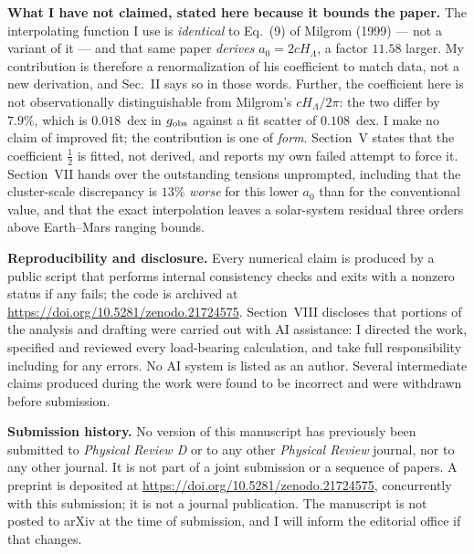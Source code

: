 \documentclass[11pt]{article}
\begin{document}
\vspace{0.4em}
\noindent\textbf{What I have not claimed, stated here because it bounds the paper.}
The interpolating function I use is \emph{identical} to Eq.~(9) of Milgrom (1999) --- not a variant of it
--- and that same paper \emph{derives} $a_0 = 2cH_\Lambda$, a factor $11.58$ larger. My contribution is
therefore a renormalization of his coefficient to match data, not a new derivation, and Sec.~II says so in
those words. Further, the coefficient here is not observationally distinguishable from Milgrom's
$cH_\Lambda/2\pi$: the two differ by $7.9\%$, which is $0.018$~dex in $g_{\rm obs}$ against a fit scatter
of $0.108$~dex. I make no claim of improved fit; the contribution is one of \emph{form}. Section~V states
that the coefficient $\tfrac12$ is fitted, not derived, and reports my own failed attempt to force it.
Section~VII hands over the outstanding tensions unprompted, including that the cluster-scale discrepancy is
$13\%$ \emph{worse} for this lower $a_0$ than for the conventional value, and that the exact interpolation
leaves a solar-system residual three orders above Earth--Mars ranging bounds.

\vspace{0.6em}
\noindent\textbf{Reproducibility and disclosure.}
Every numerical claim is produced by a public script that performs internal consistency checks and exits
with a nonzero status if any fails; the code is archived at
\url{https://doi.org/10.5281/zenodo.21724575}. Section~VIII discloses that portions of the analysis and
drafting were carried out with AI assistance: I directed the work, specified and reviewed every
load-bearing calculation, and take full responsibility including for any errors. No AI system is listed as
an author. Several intermediate claims produced during the work were found to be incorrect and were
withdrawn before submission.

\vspace{0.6em}
\noindent\textbf{Submission history.}
No version of this manuscript has previously been submitted to \textit{Physical Review D} or to any other
\textit{Physical Review} journal, nor to any other journal. It is not part of a joint submission or a
sequence of papers. A preprint is deposited at \url{https://doi.org/10.5281/zenodo.21724575}, concurrently
with this submission; it is not a journal publication. The manuscript is not posted to arXiv at the time of
submission, and I will inform the editorial office if that changes.
\end{document}
